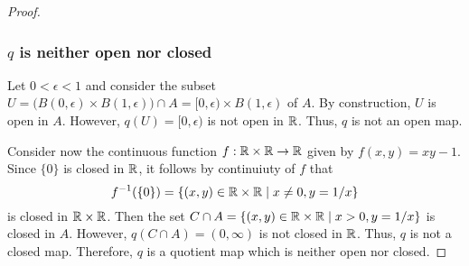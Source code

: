 \begin{solution}
\begin{proof}
      \subsubsection*{$q$ is neither open nor closed}
      Let $0 < \epsilon < 1$ and consider the subset $U = \big(B(0, \epsilon) \times B(1, \epsilon)\big) \cap A = [0, \epsilon) \times B(1, \epsilon)$ of $A$.
      By construction, $U$ is open in $A$.
      However, $q(U) = [0, \epsilon)$ is not open in $\mathbb{R}$.
      Thus, $q$ is not an open map.

      Consider now the continuous function $f: \mathbb{R} \times \mathbb{R} \rightarrow \mathbb{R}$ given by $f(x, y) = x y - 1$.
      Since $\{0\}$ is closed in $\mathbb{R}$, it follows by continuiuty of $f$ that
      \begin{equation*}
        f^{-1}(\{0\}) = \{(x, y) \in \mathbb{R} \times \mathbb{R} \mid x \neq 0, y = 1 / x \}
      \end{equation*}
      is closed in $\mathbb{R} \times \mathbb{R}$.
      Then the set $C \cap A = \{(x, y) \in \mathbb{R} \times \mathbb{R} \mid x > 0, y = 1 / x \}$ is closed in $A$.
      However, $q(C \cap A) = (0, \infty)$ is not closed in $\mathbb{R}$.
      Thus, $q$ is not a closed map.
      Therefore, $q$ is a quotient map which is neither open nor closed.
    \end{proof}
  \end{solution}
